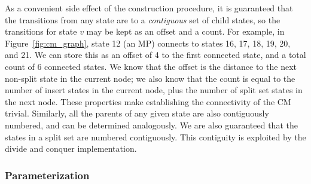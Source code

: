 \documentclass[11pt]{article}
\newif\ifdraft
\begin{document}
As a convenient side effect of the construction procedure, it is
guaranteed that the transitions from any state are to a
\emph{contiguous} set of child states, so the transitions for state
$v$ may be kept as an offset and a count. For example, in
Figure~\ref{fig:cm_graph}, state 12 (an MP) connects to states 16, 17,
18, 19, 20, and 21. We can store this as an offset of 4 to the first
connected state, and a total count of 6 connected states.  We know
that the offset is the distance to the next non-split state in the
current node; we also know that the count is equal to the number of
insert states in the current node, plus the number of split set states
in the next node. These properties make establishing the connectivity
of the CM trivial. Similarly, all the parents of any given state are
also contiguously numbered, and can be determined analogously. We are
also guaranteed that the states in a split set are numbered
contiguously.  This contiguity is exploited by the divide and conquer
implementation.

\ifdraft
\begin{figure}[tp]
\begin{center}
\texttt{[image: Figures/cm\_graph]}
\end{center}
\caption{\textbf{A complete covariance model.} Right: the CM
corresponding to the alignment in Figure~\ref{fig:input_alignment}.
The model has 81 states (boxes, stacked in a vertical array). Each
state is associated with one of the 24 nodes of the guide tree (text
to the right of the state array). States corresponding to the
consensus are in white. States responsible for insertions and
deletions are gray. The transitions from bifurcation state B10 to
start states S11 and S46 are in bold because they are special: they
are an obligate (probability 1) bifurcation. All other transitions
(thin arrows) are associated with transition probabilities.  Emission
probability distributions are not represented in the figure. Left: the
states are also arranged according to the guide tree. A blow up of
part of the model corresponding to nodes 6, 7, and 8 shows
more clearly the logic of the connectivity of transition probabilities
(see main text), and also shows why any parse tree must transit through
one and only one state in each ``split set''.}
\label{fig:cm_graph}
\end{figure}
\fi

\subsubsection{Parameterization}
\end{document}
